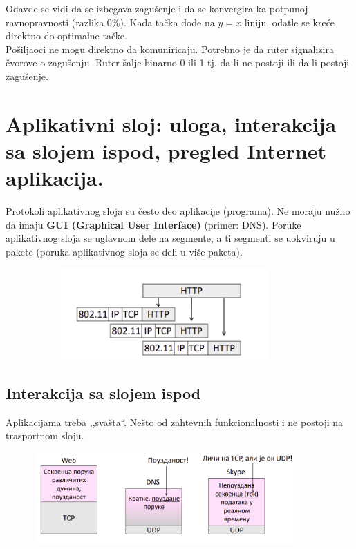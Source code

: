 \documentclass[a4paper]{article}
\begin{document}
        Odavde se vidi da se izbegava zagušenje i da se konvergira ka potpunoj ravnopravnosti (razlika 0\%).
        Kada tačka dođe na $y=x$ liniju, odatle se kreće direktno do optimalne tačke.\\
        \indent Pošiljaoci ne mogu direktno da komuniricaju. Potrebno je da ruter signalizira
        čvorove o zagušenju. Ruter šalje binarno 0 ili 1 tj. da li ne postoji ili da li postoji zagušenje.
        
\section{Aplikativni sloj: uloga, interakcija sa slojem ispod, pregled Internet aplikacija.}
    Protokoli aplikativnog sloja su često deo aplikacije (programa). Ne moraju nužno da imaju
    \textbf{GUI (Graphical User Interface)} (primer: DNS). Poruke aplikativnog sloja se uglavnom
    dele na segmente, a ti segmenti se uokviruju u pakete (poruka aplikativnog sloja
    se deli u više paketa). 
    \begin{figure}[H]
        \begin{center}
            \includegraphics[width=100mm,height=35mm]{Slike/aplikativni_sloj1.png}
        \end{center}
    \end{figure}

    \subsection{Interakcija sa slojem ispod}
        Aplikacijama treba ,,svašta``. Nešto od zahtevnih funkcionalnosti i ne postoji na
        trasportnom sloju.
        \begin{figure}[H]
            \begin{center}
                \includegraphics[width=100mm,height=35mm]{Slike/aplikativni_sloj2.png}
            \end{center}
        \end{figure}
\end{document}
